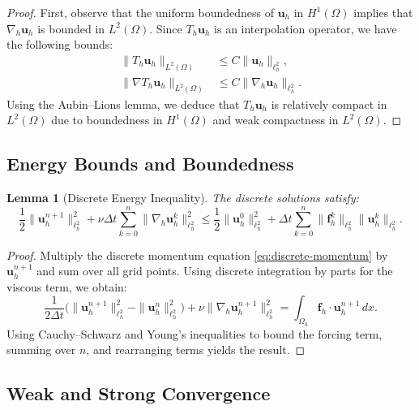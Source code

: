 \documentclass[12pt]{article}
\newtheorem{lemma}{Lemma}
\begin{document}
\begin{proof}
First, observe that the uniform boundedness of $\mathbf{u}_h$ in $H^1(\Omega)$ implies that $\nabla_h \mathbf{u}_h$ is bounded in $L^2(\Omega)$. Since $T_h \mathbf{u}_h$ is an interpolation operator, we have the following bounds:
\begin{align*}
\|T_h \mathbf{u}_h\|_{L^2(\Omega)} &\leq C \|\mathbf{u}_h\|_{\ell^2_h}, \\
\|\nabla T_h \mathbf{u}_h\|_{L^2(\Omega)} &\leq C \|\nabla_h \mathbf{u}_h\|_{\ell^2_h}.
\end{align*}
Using the Aubin--Lions lemma, we deduce that $T_h \mathbf{u}_h$ is relatively compact in $L^2(\Omega)$ due to boundedness in $H^1(\Omega)$ and weak compactness in $L^2(\Omega)$.
\end{proof}

\subsection{Energy Bounds and Boundedness}

\begin{lemma}[Discrete Energy Inequality]
The discrete solutions satisfy:
\begin{equation}
\frac{1}{2} \|\mathbf{u}_h^{n+1}\|_{\ell^2_h}^2 + \nu \Delta t \sum_{k=0}^n \|\nabla_h \mathbf{u}_h^k\|_{\ell^2_h}^2 \leq \frac{1}{2} \|\mathbf{u}_h^0\|_{\ell^2_h}^2 + \Delta t \sum_{k=0}^n \|\mathbf{f}_h^k\|_{\ell^2_h} \|\mathbf{u}_h^k\|_{\ell^2_h}.
\end{equation}
\end{lemma}

\begin{proof}
Multiply the discrete momentum equation \eqref{eq:discrete-momentum} by $\mathbf{u}_h^{n+1}$ and sum over all grid points. Using discrete integration by parts for the viscous term, we obtain:
\begin{equation}
\frac{1}{2\Delta t} \Big(\|\mathbf{u}_h^{n+1}\|_{\ell^2_h}^2 - \|\mathbf{u}_h^n\|_{\ell^2_h}^2\Big) + \nu \|\nabla_h \mathbf{u}_h^{n+1}\|_{\ell^2_h}^2 = \int_{\Omega_h} \mathbf{f}_h \cdot \mathbf{u}_h^{n+1} \, dx.
\end{equation}
Using Cauchy--Schwarz and Young's inequalities to bound the forcing term, summing over $n$, and rearranging terms yields the result.
\end{proof}

\subsection{Weak and Strong Convergence}
\end{document}
